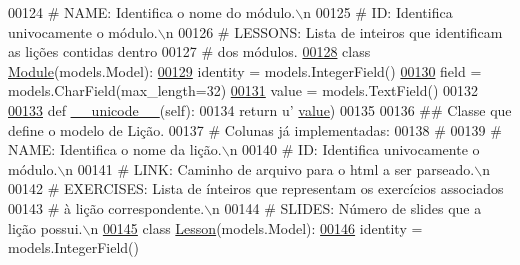 \begin{DoxyCode}
{{{{{00124 \textcolor{comment}{#   NAME:       Identifica o nome do módulo.\(\backslash\)n}
00125 \textcolor{comment}{#   ID:         Identifica univocamente o módulo.\(\backslash\)n}
00126 \textcolor{comment}{#   LESSONS:    Lista de inteiros que identificam as lições contidas dentro}
00127 \textcolor{comment}{#                   dos módulos.}
\hypertarget{ELO_2models_8py_source_l00128}{}\hyperlink{classELO_1_1models_1_1Module}{00128} \textcolor{keyword}{class }\hyperlink{classELO_1_1models_1_1Module}{Module}(models.Model):
\hypertarget{ELO_2models_8py_source_l00129}{}\hyperlink{classELO_1_1models_1_1Module_abbf09409159a27a42ea6cb33fcc7fde7}{00129}     identity = models.IntegerField()
\hypertarget{ELO_2models_8py_source_l00130}{}\hyperlink{classELO_1_1models_1_1Module_ad05ba106a7012cd72877fe21e8639e2d}{00130}     field = models.CharField(max\_length=32)
\hypertarget{ELO_2models_8py_source_l00131}{}\hyperlink{classELO_1_1models_1_1Module_a5b31cea93dea5474f3ff974cd745e39f}{00131}     value = models.TextField()
00132 
\hypertarget{ELO_2models_8py_source_l00133}{}\hyperlink{classELO_1_1models_1_1Module_a8fc9fadf09fa7b3bbcfea69ebe25d278}{00133}     \textcolor{keyword}{def }\hyperlink{classELO_1_1models_1_1Module_a8fc9fadf09fa7b3bbcfea69ebe25d278}{\_\_unicode\_\_}(self):
00134         \textcolor{keywordflow}{return} \textcolor{stringliteral}{u'%
      \hyperlink{classELO_1_1models_1_1Module_a5b31cea93dea5474f3ff974cd745e39f}{value})
00135 
00136 \textcolor{comment}{## Classe que define o modelo de Lição.}
00137 \textcolor{comment}{#   Colunas já implementadas:}
00138 \textcolor{comment}{#}
00139 \textcolor{comment}{#   NAME:       Identifica o nome da lição.\(\backslash\)n}
00140 \textcolor{comment}{#   ID:         Identifica univocamente o módulo.\(\backslash\)n}
00141 \textcolor{comment}{#   LINK:       Caminho de arquivo para o html a ser parseado.\(\backslash\)n}
00142 \textcolor{comment}{#   EXERCISES:  Lista de ínteiros que representam os exercícios associados}
00143 \textcolor{comment}{#                   à lição correspondente.\(\backslash\)n}
00144 \textcolor{comment}{#   SLIDES:     Número de slides que a lição possui.\(\backslash\)n}
\hypertarget{ELO_2models_8py_source_l00145}{}\hyperlink{classELO_1_1models_1_1Lesson}{00145} \textcolor{keyword}{class }\hyperlink{classELO_1_1models_1_1Lesson}{Lesson}(models.Model):
\hypertarget{ELO_2models_8py_source_l00146}{}\hyperlink{classELO_1_1models_1_1Lesson_aa650c6add387eee9e15421717074c0d3}{00146}     identity = models.IntegerField()
}}}}}}
\end{DoxyCode}
